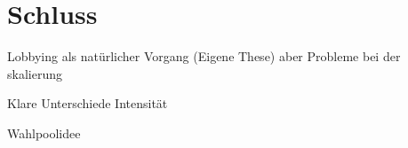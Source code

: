 \section{Schluss}
\begin{itemize*}
\item Lobbying als natürlicher Vorgang (Eigene These) aber Probleme
bei der skalierung
\item Klare Unterschiede Intensität
\item Wahlpoolidee
\end{itemize*}

\newpage



\listoftodos


